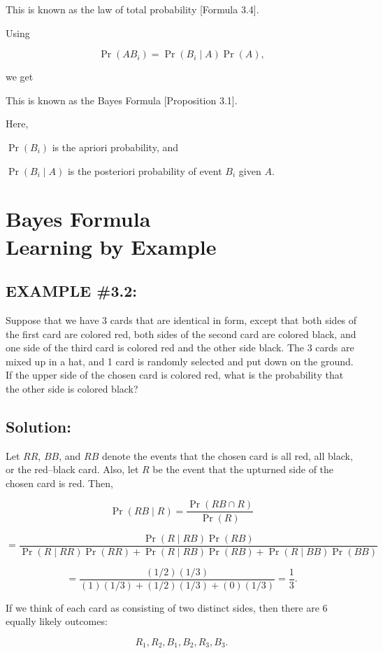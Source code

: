 \documentclass[12pt]{article}
\begin{document}
This is known as the law of total probability [Formula 3.4].

Using

\[
\Pr(AB_i) = \Pr(B_i \mid A)\Pr(A),
\]

we get

This is known as the Bayes Formula [Proposition 3.1].

Here,

$\Pr(B_i)$ is the apriori probability, and

$\Pr(B_i \mid A)$ is the posteriori probability of event $B_i$ given $A$.

\section*{Bayes Formula\\Learning by Example}

\subsection*{EXAMPLE \#3.2:}

Suppose that we have 3 cards that are identical in form, except that both sides of the first card are colored red, both sides of the second card are colored black, and one side of the third card is colored red and the other side black. The 3 cards are mixed up in a hat, and 1 card is randomly selected and put down on the ground. If the upper side of the chosen card is colored red, what is the probability that the other side is colored black?

\subsection*{Solution:}

Let $RR$, $BB$, and $RB$ denote the events that the chosen card is all red, all black, or the red--black card. Also, let $R$ be the event that the upturned side of the chosen card is red. Then,

\[
\Pr(RB \mid R) = \frac{\Pr(RB \cap R)}{\Pr(R)}
\]

\[
= \frac{\Pr(R \mid RB)\Pr(RB)}{\Pr(R \mid RR)\Pr(RR) + \Pr(R \mid RB)\Pr(RB) + \Pr(R \mid BB)\Pr(BB)}
\]

\[
= \frac{(1/2)(1/3)}{(1)(1/3) + (1/2)(1/3) + (0)(1/3)} = \frac{1}{3}.
\]

If we think of each card as consisting of two distinct sides, then there are 6 equally likely outcomes:

\[
R_1, R_2, B_1, B_2, R_3, B_3.
\]
\end{document}
